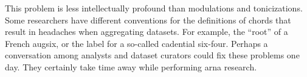 
This problem is less intellectually profound than
modulations and tonicizations. Some researchers have
different conventions for the definitions of chords that
result in headaches when aggregating datasets. For example,
the ``root'' of a French \gls{augsix}, or the label for a
so-called cadential six-four. Perhaps a conversation among
analysts and dataset curators could fix these problems one
day. They certainly take time away while performing
\gls{arna} research.

